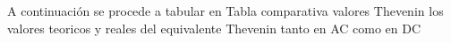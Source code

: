 A continuación se procede a tabular en Tabla comparativa valores Thevenin los valores teoricos y reales del equivalente Thevenin tanto en AC como en DC





